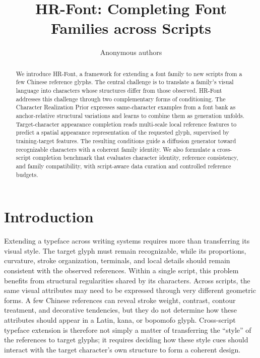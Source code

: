 \documentclass{article}
\title{HR-Font: Completing Font Families across Scripts}
\author{Anonymous authors}
\newcommand{\method}{HR-Font\xspace}
\begin{document}
\maketitle

\begin{abstract}
We introduce \method, a framework for extending a font family to new scripts from a few Chinese reference glyphs.
The central challenge is to translate a family's visual language into characters whose structures differ from those observed.
\method addresses this challenge through two complementary forms of conditioning.
The Character Realization Prior expresses same-character examples from a font bank as anchor-relative structural variations and learns to combine them as generation unfolds.
Target-character appearance completion reads multi-scale local reference features to predict a spatial appearance representation of the requested glyph, supervised by training-target features.
The resulting conditions guide a diffusion generator toward recognizable characters with a coherent family identity.
We also formulate a cross-script completion benchmark that evaluates character identity, reference consistency, and family compatibility, with script-aware data curation and controlled reference budgets.
\end{abstract}

\section{Introduction}
\label{sec:intro}

Extending a typeface across writing systems requires more than transferring its visual style.
The target glyph must remain recognizable, while its proportions, curvature, stroke organization, terminals, and local details should remain consistent with the observed references.
Within a single script, this problem benefits from structural regularities shared by its characters.
Across scripts, the same visual attributes may need to be expressed through very different geometric forms.
A few Chinese references can reveal stroke weight, contrast, contour treatment, and decorative tendencies, but they do not determine how these attributes should appear in a Latin, kana, or bopomofo glyph.
Cross-script typeface extension is therefore not simply a matter of transferring the ``style'' of the references to target glyphs; it requires deciding how these style cues should interact with the target character's own structure to form a coherent design.
\end{document}
